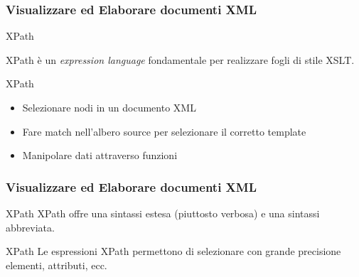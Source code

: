 \begin{frame}
    \frametitle{Visualizzare ed Elaborare documenti XML}
    \addtocounter{nframe}{1}
    

    \begin{block}{XPath}
        
        XPath è un \textit{expression language} fondamentale per realizzare fogli di stile XSLT.
        
    \end{block}
     
    \begin{block}{XPath}
        \begin{itemize}
            \item Selezionare nodi in un documento XML
            \item Fare match nell'albero source per selezionare il corretto template
            \item Manipolare dati attraverso funzioni
        \end{itemize}
    \end{block}
    
\end{frame}

\begin{frame}
    \frametitle{Visualizzare ed Elaborare documenti XML}
    \addtocounter{nframe}{1}
    

    \begin{block}{XPath}
        XPath offre una sintassi estesa (piuttosto verbosa) e una sintassi abbreviata.
    \end{block}

    \begin{block}{XPath}
        Le espressioni XPath permettono di selezionare con grande precisione elementi, attributi, ecc.
    \end{block}
    
\end{frame}

